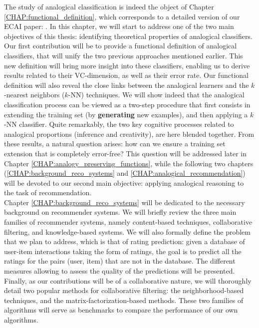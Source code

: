 The study of analogical classification is indeed the object of Chapter
\ref{CHAP:functional_definition}, which corresponds to a detailed version of our
ECAI paper: \cite{HugPraRicSerECAI16}. In this chapter, we will start to
address one of the two main objectives of this thesis: identifying theoretical
properties of analogical classifiers. Our first contribution will be to provide
a functional definition of analogical classifiers, that will unify the two
previous approaches mentioned earlier. This new definition will bring more
insight into these classifiers, enabling us to derive results related to their
VC-dimension, as well as their error rate. Our functional definition will also
reveal the close links between the analogical learners and the $k$-nearest
neighbors ($k$-NN) techniques. We will show indeed that the analogical
classification process can be viewed as a two-step procedure that first
consists in extending the training
set (by \textbf{generating} new examples), and then applying a $k$-NN
classifier. Quite remarkably, the two key cognitive processes related to
analogical proportions (inference and creativity),
are here blended together. From these results, a natural question arises: how
can we ensure a training set extension that is completely error-free? This
question will be addressed later in Chapter
\ref{CHAP:analogy_preserving_functions}, while the  following two chapters
(\ref{CHAP:background_reco_systems} and \ref{CHAP:analogical_recommendation})
will be devoted to our second main objective: applying analogical reasoning to
the task of recommendation.\\

Chapter \ref{CHAP:background_reco_systems} will be dedicated to the necessary
background on recommender systems. We will briefly review the three main
families of recommender systems, namely content-based techniques, collaborative
filtering, and knowledge-based systems. We will also formally define the
problem that we plan to address, which is that of rating prediction: given a
database of  user-item interactions taking the form of ratings, the goal is to
predict all the ratings for the pairs (user, item) that are not in the
database. The different measures allowing to assess the quality of the
predictions will be presented. Finally, as our contributions will be of a
collaborative nature, we will thoroughly detail two popular methods for
collaborative filtering: the neighborhood-based techniques, and the
matrix-factorization-based methods. These two families of algorithms will serve
as benchmarks to compare the performance of our own algorithms.\\

